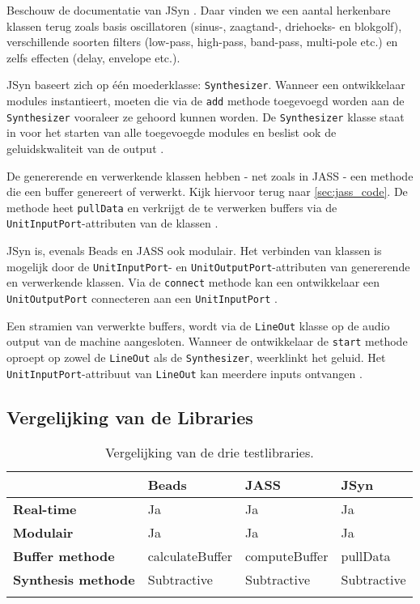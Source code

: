 Beschouw de documentatie van JSyn \autocite{jsyndocs}. Daar vinden we een aantal herkenbare klassen terug zoals basis oscillatoren (sinus-, zaagtand-, driehoeks- en blokgolf), verschillende soorten filters (low-pass, high-pass, band-pass, multi-pole etc.) en zelfs effecten (delay, envelope etc.).

JSyn baseert zich op één moederklasse: \verb+Synthesizer+. Wanneer een ontwikkelaar modules instantieert, moeten die via de \verb+add+ methode toegevoegd worden aan de \verb+Synthesizer+ vooraleer ze gehoord kunnen worden. De \verb+Synthesizer+ klasse staat in voor het starten van alle toegevoegde modules en beslist ook de geluidskwaliteit van de output \autocite{jsyndocs}.

De genererende en verwerkende klassen hebben - net zoals in JASS - een methode die een buffer genereert of verwerkt. Kijk hiervoor terug naar \ref{sec:jass_code}. De methode heet \verb+pullData+ en verkrijgt de te verwerken buffers via de \verb+UnitInputPort+-attributen van de klassen \autocite{jsyndocs}.

JSyn is, evenals Beads en JASS ook modulair. Het verbinden van klassen is mogelijk door de \verb+UnitInputPort+- en \verb+UnitOutputPort+-attributen van genererende en verwerkende klassen. Via de \verb+connect+ methode kan een ontwikkelaar een \verb+UnitOutputPort+ connecteren aan een \verb+UnitInputPort+ \autocite{jsyndocs}.

Een stramien van verwerkte buffers, wordt via de \verb+LineOut+ klasse op de audio output van de machine aangesloten. Wanneer de ontwikkelaar de \verb+start+ methode oproept op zowel de \verb+LineOut+ als de \verb+Synthesizer+, weerklinkt het geluid. Het \verb+UnitInputPort+-attribuut van \verb+LineOut+ kan meerdere inputs ontvangen \autocite{jsyndocs}.

\subsection*{Vergelijking van de Libraries}

\begin{longtable}[c]{l|lll}
         & \textbf{Beads} & \textbf{JASS} & \textbf{JSyn} \\ \hline
        \textbf{Real-time} & Ja & Ja & Ja \\
        \textbf{Modulair} & Ja & Ja & Ja \\
        \textbf{Buffer methode} & calculateBuffer & computeBuffer & pullData \\
        \textbf{Synthesis methode} & Subtractive & Subtractive & Subtractive \\
    \caption{Vergelijking van de drie testlibraries.}
    \label{tab:vergelijking}
\end{longtable}

